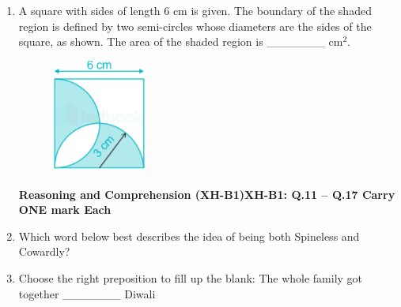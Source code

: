 \documentclass[12pt]{article}
\theoremstyle{remark}
\begin{document}
\begin{enumerate}
\item A square with sides of length 6 cm is given. The boundary of the shaded region is defined by two semi-circles whose diameters are the sides of the square, as shown. The area of the shaded region is \_\_\_\_\_\_\_ cm$^2$.
\begin{figure}[H]
    \centering
    \includegraphics[width=0.3\textwidth]{Figs/Q10.png}
    \caption{}
    \label{fig:5.3}
\end{figure}
\begin{enumerate}
\end{enumerate}
\hfill{}
\newpage
\textbf{Reasoning and Comprehension (XH-B1)\newline XH-B1: Q.11 – Q.17 Carry ONE mark Each}
\item Which word below best describes the idea of being both Spineless and Cowardly?
\begin{enumerate}
\end{enumerate}
\hfill{}
\item Choose the right preposition to fill up the blank: The whole family got together \_\_\_\_\_\_\_ Diwali
\begin{enumerate}
\end{enumerate}
\end{enumerate}
\end{document}
